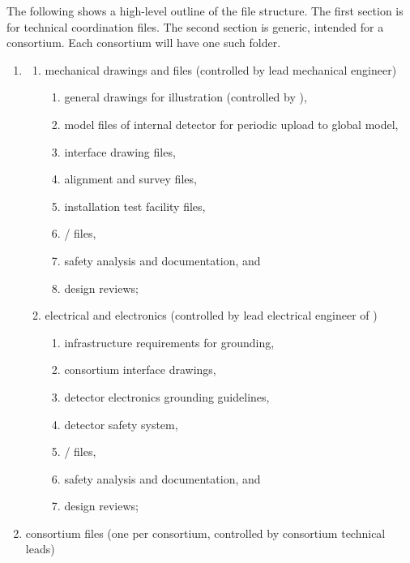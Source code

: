The following shows a high-level outline of the file structure. The
first section is for technical coordination files. The second
section is generic, intended for a consortium. Each consortium will have one such
folder.
\begin{enumerate}
 \item {}  %
 \begin{enumerate}
  \item mechanical drawings and files (controlled by  lead mechanical engineer)
  
  \begin{enumerate}
    \item {} general drawings for illustration (controlled by ),
    \item \threed model files of internal detector for periodic upload to global model,
    \item \twod interface drawing files,
    \item alignment and survey files,
    \item {} installation test facility files,
    \item {}/ files,
    \item safety analysis and documentation, and 
    \item design reviews;
  \end{enumerate}
  
  \item electrical and electronics (controlled by lead electrical engineer of )
  \begin{enumerate}
    \item infrastructure requirements for grounding,
    \item consortium interface drawings,
    \item detector electronics grounding guidelines,
    \item detector safety system,
    \item {}/ files,
    \item safety analysis and documentation, and 
      \item design reviews;
  \end{enumerate}
  
 \end{enumerate}

 \item consortium files (one per consortium, controlled by consortium technical leads)   %


\end{enumerate}
